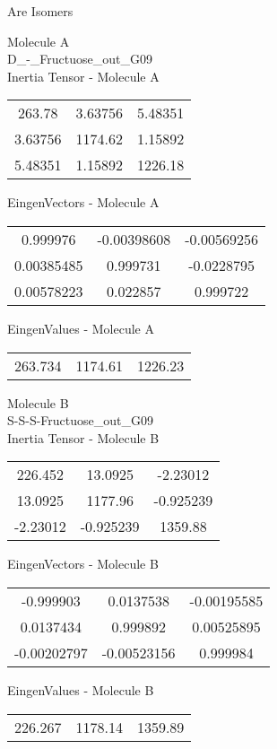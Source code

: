 \begin{center}
\vtab
\vtab
\textcolor{NavyBlue}{\Large Are Isomers}
\end{center}
\newpage
\begin{multicols}{2}
\begin{center}
Molecule A \\ 
D\_-\_Fructuose\_out\_G09
\\
Inertia Tensor - Molecule A \\
\vtab
\begin{tabular}{|c c c|}
263.78	 & 	3.63756	 & 	5.48351	 \\
3.63756	 & 	1174.62	 & 	1.15892	 \\
5.48351	 & 	1.15892	 & 	1226.18
\end{tabular}

\vtab
 EingenVectors - Molecule A     \\
\vtab
\begin{tabular}{|c c c|}
0.999976	 & 	-0.00398608	 & 	-0.00569256	 \\
0.00385485	 & 	0.999731	 & 	-0.0228795	 \\
0.00578223	 & 	0.022857	 & 	0.999722
\end{tabular}

\vtab
 EingenValues - Molecule A     \\
\vtab
\begin{tabular}{|c c c|}
263.734	 & 	1174.61	 & 	1226.23
\end{tabular}
\columnbreak

Molecule B \\ 
S-S-S-Fructuose\_out\_G09
\\
Inertia Tensor - Molecule B \\
\vtab
\begin{tabular}{|c c c|}
226.452	 & 	13.0925	 & 	-2.23012	 \\
13.0925	 & 	1177.96	 & 	-0.925239	 \\
-2.23012	 & 	-0.925239	 & 	1359.88
\end{tabular}

\vtab
 EingenVectors - Molecule B     \\
\vtab
\begin{tabular}{|c c c|}
-0.999903	 & 	0.0137538	 & 	-0.00195585	 \\
0.0137434	 & 	0.999892	 & 	0.00525895	 \\
-0.00202797	 & 	-0.00523156	 & 	0.999984
\end{tabular}

\vtab
 EingenValues - Molecule B     \\
\vtab
\begin{tabular}{|c c c|}
226.267	 & 	1178.14	 & 	1359.89
\end{tabular}

\end{center}
\end{multicols}

